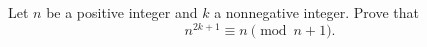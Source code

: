 Let $n$ be a positive integer and $k$ a nonnegative integer. Prove that
\[n^{2k+1}\equiv n\pmod{n+1}.\]
